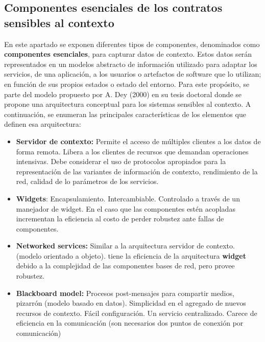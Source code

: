 \subsection{Componentes esenciales de los contratos sensibles al contexto}

En este apartado se exponen diferentes tipos de componentes, denominados como \textbf{componentes esenciales}, para capturar datos de contexto. Estos datos serán representados en un modelos abstracto de información  utilizado para adaptar los servicios, de una aplicación, a los usuarios o artefactos de software que lo utilizan; en función de sus propios estados o estado del entorno. Para este propósito, se parte del modelo propuesto por A. Dey (2000) en su tesis doctoral \cite{Dey} donde se propone una arquitectura conceptual para los sistemas sensibles  al contexto. A continuación, se enumeran las principales características de los elementos que definen esa arquitectura:


\begin{itemize}

\item \textbf {Servidor de contexto:} Permite el acceso de múltiples
clientes a los datos de forma remota.  Libera a los clientes de
recursos que demandan operaciones intensivas.  Debe considerar el uso
de protocolos apropiados para la representación de las variantes de información de contexto, rendimiento de la red, calidad de lo parámetros de los servicios.


\item \textbf{Widgets}:  Encapsulamiento.  Intercambiable.
Controlado a través de un manejador de widget. En el caso que las
componentes estén acopladas incrementan la eficiencia al costo de perder robustez ante fallas de componentes.


\item \textbf{Networked services:}  Similar a la arquitectura
servidor de contexto. (modelo orientado a objeto).  tiene la eficiencia de la arquitectura \textbf{widget} debido a la complejidad de las componentes bases de red, pero provee robustez.


\item \textbf{Blackboard model:}  Procesos post-mensajes para
compartir medios, pizarrón (modelo basado en datos). Simplicidad en el agregado de nuevos recursos de contexto.  Fácil configuración.  Un servicio centralizado.  Carece de eficiencia en la comunicación (son
necesarios dos puntos de conexión por comunicación)

\end{itemize}

